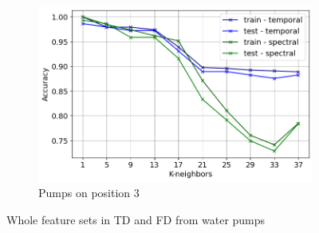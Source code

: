 \documentclass{llncs}
\begin{document}
\begin{figure}
\begin{subfigure}[b]{0.32\textwidth}
         \centering
         \includegraphics[width=\textwidth]{fig/all-features-pumps/binary.png}
         \caption{Pumps on position 3}
     \end{subfigure}
     \caption{Whole feature sets in TD and FD from water pumps}
\end{figure}
\end{document}
